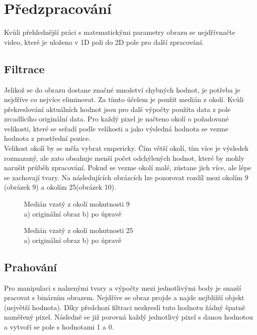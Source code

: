 \section{Předzpracování}

Kvůli přehlednější práci s matematickými parametry obrazu se nejdřívnačte video, které je uloženo v 1D poli do 2D pole pro další zpracování.\\

\subsection{Filtrace}
Jelikož se do obrazu dostane značné množství chybných hodnot, je potřeba je nejdříve co nejvíce eliminovat. Za tímto účelem je použit medián z okolí. Kvůli překreslování aktuálních hodnot jsou pro dalš výpočty použita data z pole zrcadlícího originální data. Pro každý pixel je načteno okolí o požadované velikosti, které se seřadí podle velikosti a jako výsledná hodnota se vezme hodnota z prostřední pozice.\\

Velikost okolí by se měla vybrat empericky. Čím větší okolí, tím více je výsledek rozmazaný, ale zato obsahuje menší počet odchýlených hodnot, které by mohly narušit průběh zpracování. Pokud se vezme okolí malé, zůstane jich více, ale lépe se zachovají tvary. Na následujících obrázcích lze pozorovat rozdíl mezi okolím 9 (obrázek 9) a okolím 25(obrázek 10).\\

\begin{figure}[htp]
\centering
{} \hfil
{}
\caption{Medián vzatý z okolí mohutnosti 9 \\ a) originální obraz b) po úpravě}
\label{fig:neigh9}
\end{figure}
\begin{figure}[htp]
\centering
{} \hfil
{}
\caption{Medián vzatý z okolí mohutnosti 25 \\ a) originální obraz b) po úpravě}
\label{fig:neigh25}
\end{figure}

\subsection{Prahování}
Pro manipulaci s nalzenými tvary a výpočty mezi jednotlivými body je snazší pracovat s binárním obrazem. Nejdříve se obraz projde a najde nejbližší objekt (největší hodnota). Díky předchozí filtraci nezkreslí tuto hodnotu žádný špatně naměřený pixel. Následně se již porovná každý jednotlivý pixel s danou hodnotou a vytvoří se pole s hodnotami 1 a 0.\\

